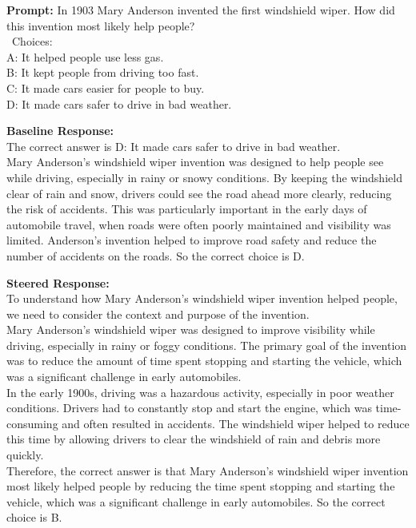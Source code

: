 \documentclass{article} %
\begin{document}
\begin{tcolorbox}[examplebox={Llama-3.2-1B-Instruct on ARC-c: correct baseline, incorrect steering}]
\textbf{Prompt:} 
In 1903 Mary Anderson invented the first windshield wiper. How did this invention most likely help people?\\\ Choices: \\ \textcolor{incorrectcolor}{A: It helped people use less gas.} \\ \textcolor{incorrectcolor}{B: It kept people from driving too fast.} \\ \textcolor{incorrectcolor}{C: It made cars easier for people to buy.} \\ \textcolor{correctcolor}{D: It made cars safer to drive in bad weather.}

\vspace{0.5em}
\textbf{Baseline Response:}\\
The correct answer is D: It made cars safer to drive in bad weather.\\Mary Anderson's windshield wiper invention was designed to help people see while driving, especially in rainy or snowy conditions. By keeping the windshield clear of rain and snow, drivers could see the road ahead more clearly, reducing the risk of accidents. This was particularly important in the early days of automobile travel, when roads were often poorly maintained and visibility was limited. Anderson's invention helped to improve road safety and reduce the number of accidents on the roads. \textcolor{correctcolor}{So the correct choice is D.}

\vspace{0.5em}
\textbf{Steered Response:}\\
To understand how Mary Anderson's windshield wiper invention helped people, we need to consider the context and purpose of the invention.\\Mary Anderson's windshield wiper was designed to improve visibility while driving, especially in rainy or foggy conditions. The primary goal of the invention was to reduce the amount of time spent stopping and starting the vehicle, which was a significant challenge in early automobiles.\\In the early 1900s, driving was a hazardous activity, especially in poor weather conditions. Drivers had to constantly stop and start the engine, which was time-consuming and often resulted in accidents. The windshield wiper helped to reduce this time by allowing drivers to clear the windshield of rain and debris more quickly.\\Therefore, the correct answer is that Mary Anderson's windshield wiper invention most likely helped people by reducing the time spent stopping and starting the vehicle, which was a significant challenge in early automobiles. \textcolor{incorrectcolor}{So the correct choice is B.}
\end{tcolorbox}
\end{document}
